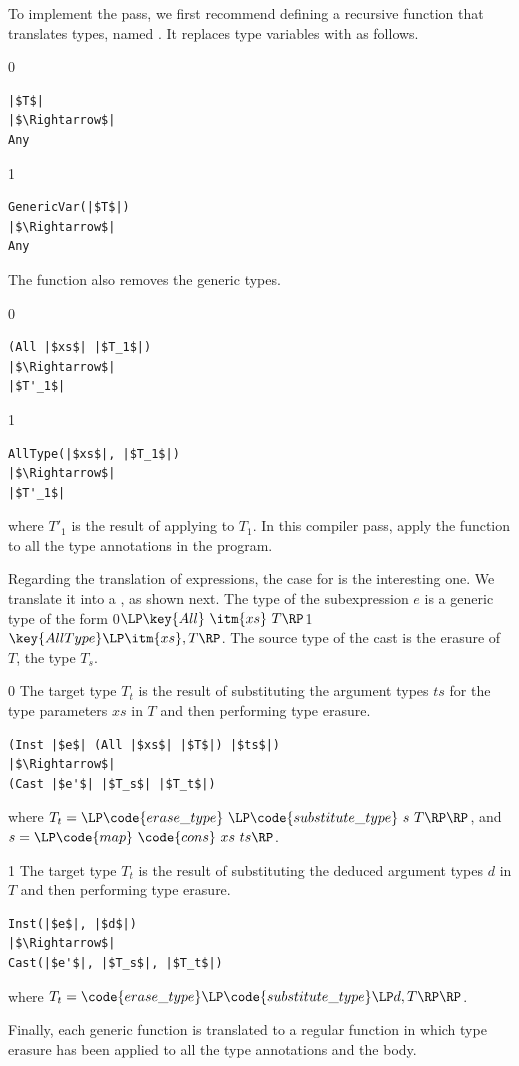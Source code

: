 \documentclass[7x10]{TimesAPriori_MIT}%
\def\racketEd{0}
\def\pythonEd{1}
\def\edition{1}
\newcommand{\racket}[1]{{\if\edition\racketEd{#1}\fi}}
\newcommand{\pythonColor}[0]{}
\newcommand{\python}[1]{{\if\edition\pythonEd\pythonColor #1\fi}}
\numberwithin{theorem}{chapter}
\numberwithin{definition}{chapter}
\numberwithin{equation}{chapter}
\begin{document}
To implement the  pass, we first recommend defining
a recursive function that translates types, named
. It replaces type variables with \CANYTY{} as
follows.
%
{\if\edition\racketEd
\begin{lstlisting}
|$T$|
|$\Rightarrow$|
Any
\end{lstlisting}
\fi}
{\if\edition\pythonEd\pythonColor
\begin{lstlisting}
GenericVar(|$T$|)
|$\Rightarrow$|
Any
\end{lstlisting}
\fi}
%
\noindent The  function also removes the generic
 types.
%
{\if\edition\racketEd
\begin{lstlisting}
(All |$xs$| |$T_1$|)
|$\Rightarrow$|
|$T'_1$|
\end{lstlisting}
\fi}
{\if\edition\pythonEd\pythonColor
\begin{lstlisting}
AllType(|$xs$|, |$T_1$|)
|$\Rightarrow$|
|$T'_1$|
\end{lstlisting}
\fi}
where $T'_1$ is the result of applying  to $T_1$.
%
In this compiler pass, apply the  function to all 
the type annotations in the program.

Regarding the translation of expressions, the case for  is
the interesting one. We translate it into a , as shown
next.
The type of the subexpression $e$ is a generic type of the form
\racket{$\LP\key{All}~\itm{xs}~T\RP$}\python{$\key{AllType}\LP\itm{xs}, T\RP$}.
The source type of the cast is the erasure of $T$, the type $T_s$.
%
{\if\edition\racketEd
%
The target type $T_t$ is the result of substituting the argument types
$ts$ for the type parameters $xs$ in $T$ and then performing type
erasure.
%
\begin{lstlisting}
(Inst |$e$| (All |$xs$| |$T$|) |$ts$|)
|$\Rightarrow$|
(Cast |$e'$| |$T_s$| |$T_t$|)
\end{lstlisting}
%
where $T_t = \LP\code{erase\_type}~\LP\code{substitute\_type}~s~T\RP\RP$,
and $s = \LP\code{map}~\code{cons}~xs~ts\RP$.
\fi}
{\if\edition\pythonEd\pythonColor
%
The target type $T_t$ is the result of substituting the deduced
argument types $d$ in $T$ and then performing type erasure.
%
\begin{lstlisting}
Inst(|$e$|, |$d$|)
|$\Rightarrow$|
Cast(|$e'$|, |$T_s$|, |$T_t$|)
\end{lstlisting}
%
where
$T_t = \code{erase\_type}\LP\code{substitute\_type}\LP d, T\RP\RP$.
\fi}

Finally, each generic function is translated to a regular
function in which type erasure has been applied to all the type
annotations and the body.
\end{document}
